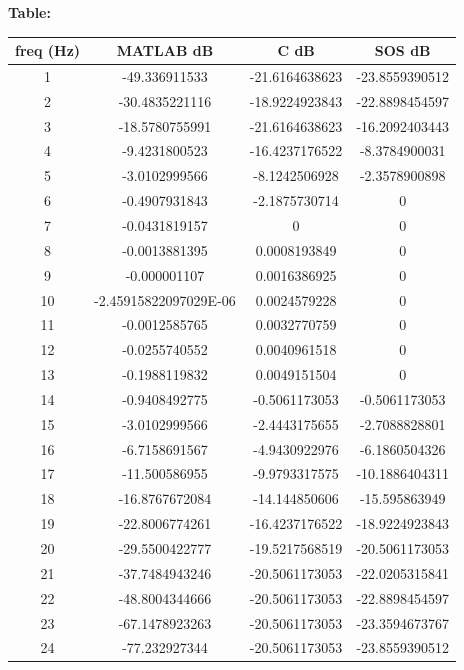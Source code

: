 \documentclass{article}
\begin{document}
\textbf{Table:}
\begin{center}
\begin{tabular}{c|c|c|c}
freq (Hz)	& MATLAB dB	& C dB	& SOS dB \\ \hline
1  & 	-49.336911533	           &   -21.6164638623	   & -23.8559390512 \\ \hline
2  & 	-30.4835221116	         &   -18.9224923843	   & -22.8898454597 \\ \hline
3  & 	-18.5780755991	         &   -21.6164638623	   & -16.2092403443 \\ \hline
4  & 	-9.4231800523	           &   -16.4237176522	   & -8.3784900031  \\ \hline
5  & 	-3.0102999566	           &   -8.1242506928	   & -2.3578900898  \\ \hline
6  & 	-0.4907931843	           &   -2.1875730714	   & 0              \\ \hline
7  & 	-0.0431819157	           &   0	               & 0              \\ \hline
8  & 	-0.0013881395	           &   0.0008193849	     & 0              \\ \hline
9  & 	-0.000001107	           &   0.0016386925	     & 0              \\ \hline
10 &	-2.45915822097029E-06	   &   0.0024579228	     & 0              \\ \hline
11 &	-0.0012585765	           &   0.0032770759	     & 0              \\ \hline
12 &	-0.0255740552	           &   0.0040961518	     & 0              \\ \hline
13 &	-0.1988119832	           &   0.0049151504	     & 0              \\ \hline
14 &	-0.9408492775	           &   -0.5061173053	   & -0.5061173053  \\ \hline
15 &	-3.0102999566	           &   -2.4443175655	   & -2.7088828801  \\ \hline
16 &	-6.7158691567	           &   -4.9430922976	   & -6.1860504326  \\ \hline
17 &	-11.500586955	           &   -9.9793317575	   & -10.1886404311 \\ \hline
18 &	-16.8767672084	         &   -14.144850606	   & -15.595863949  \\ \hline
19 &	-22.8006774261	         &   -16.4237176522	   & -18.9224923843 \\ \hline
20 &	-29.5500422777	         &   -19.5217568519	   & -20.5061173053 \\ \hline
21 &	-37.7484943246	         &   -20.5061173053	   & -22.0205315841 \\ \hline
22 &	-48.8004344666	         &   -20.5061173053	   & -22.8898454597 \\ \hline
23 &	-67.1478923263	         &   -20.5061173053	   & -23.3594673767 \\ \hline
24 &	-77.232927344	           &   -20.5061173053	   & -23.8559390512 \\ \hline
\end{tabular}
\end{center}
\end{document}
